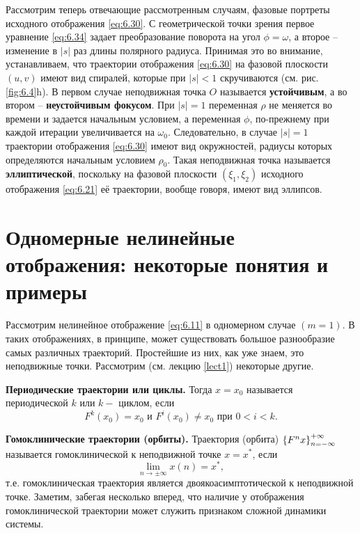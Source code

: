 Рассмотрим теперь отвечающие рассмотренным случаям, фазовые портреты исходного отображения \eqref{eq:6.30}. С геометрической точки зрения первое уравнение \eqref{eq:6.34} задает преобразование поворота на угол
$\phi = \omega$, а второе -- изменение в $|s|$ раз длины полярного радиуса. Принимая это
во внимание, устанавливаем, что траектории отображения \eqref{eq:6.30} на фазовой плоскости $(u,v)$ 
имеют вид спиралей, которые при $|s|<1$ скручиваются (см. рис.\ref{fig:6.4}h). В первом случае неподвижная точка $O$ называется \textbf{устойчивым}, а во втором -- \textbf{неустойчивым фокусом}.
При $|s|=1$ переменная $\rho$ не меняется во времени и задается начальным условием, а переменная $\phi$, по-прежнему при каждой итерации увеличивается на $\omega_0$. Следовательно, в случае $|s| = 1$ траектории отображения \eqref{eq:6.30} имеют вид окружностей, радиусы которых определяются начальным условием $\rho_0$. Такая неподвижная точка называется \textbf{эллиптической},
поскольку на фазовой плоскости $(\xi_1,\xi_2)$ исходного отображения \eqref{eq:6.21} её траектории, вообще говоря, имеют вид эллипсов.


\section{Одномерные нелинейные отображения: некоторые понятия и примеры}%
\label{sec:6.6}

Рассмотрим нелинейное отображение \eqref{eq:6.11} в одномерном случае $(m=1)$.
В таких отображениях, в принципе, может существовать большое разнообразие самых различных траекторий. Простейшие из них, как уже знаем, это
неподвижные точки. Рассмотрим (см. лекцию \ref{lect1}) некоторые другие.

\textbf{Периодические траектории или циклы.} Тогда $x=x_0$ называется периодической $k$ или $k-$ циклом, если
\begin{equation}
        \label{eq:}
        F^k(x_0) = x_0 \text{ и } F^i(x_0) \neq x_0 \text{ при } 0<i<k.
\end{equation}

\textbf{Гомоклинические траектории (орбиты).} Траектория (орбита)
$\qty{ F^n x}^{+\infty}_{n= - \infty}$ называется гомоклинической к неподвижной точке $x= x^*$, если
\begin{equation}
        \label{eq:}
        \lim_{n \to \pm \infty} x(n) = x^*,
\end{equation}
т.е. гомоклиническая траектория является двоякоасимптотической к
неподвижной точке. Заметим, забегая несколько вперед, что наличие у отображения гомоклинической 
траектории может служить признаком сложной динамики системы.

